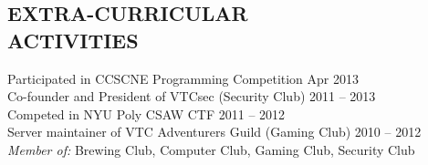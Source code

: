 \documentclass[margin]{res}
\begin{document}
\begin{resume}
\section{EXTRA-CURRICULAR \\ ACTIVITIES} 
                Participated in CCSCNE Programming Competition
                	\hfill Apr 2013\\
                Co-founder and President of VTCsec (Security Club) 
                    \hfill 2011 -- 2013\\
                Competed in NYU Poly CSAW CTF \hfill 2011 -- 2012\\
                Server maintainer of VTC Adventurers Guild (Gaming Club)
                    \hfill 2010 -- 2012\\
                {\sl Member of:} Brewing Club, Computer Club, Gaming Club, 
                                 Security Club
 

\end{resume}
\end{document}
